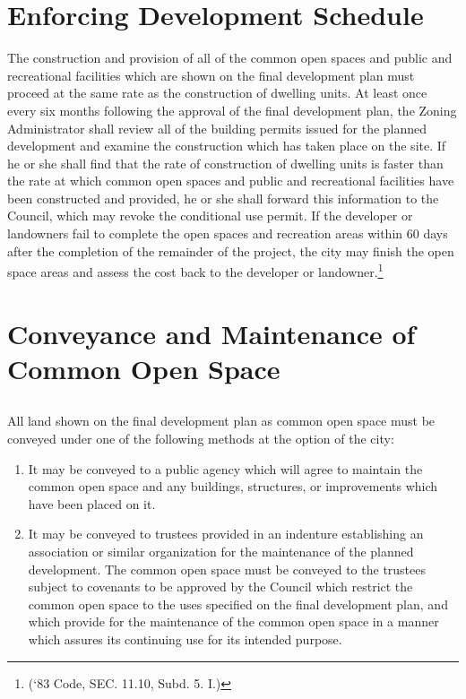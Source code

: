\section{Enforcing Development Schedule}
The construction and provision of all of the common open spaces and public and recreational facilities which are shown on the final development plan must proceed at the same rate as the construction of dwelling units. At least once every six months following the approval of the final development plan, the Zoning Administrator shall review all of the building permits issued for the planned development and examine the construction which has taken place on the site. If he or she shall find that the rate of construction of dwelling units is faster than the rate at which common open spaces and public and recreational facilities have been constructed and provided, he or she shall forward this information to the Council, which may revoke the conditional use permit. If the developer or landowners fail to complete the open spaces and recreation areas within 60 days after the completion of the remainder of the project, the city may finish the open space areas and assess the cost back to the developer or landowner.\footnote{(‘83 Code, SEC. 11.10, Subd. 5. I.)}

\section{Conveyance and Maintenance of Common Open Space}
\subsection{}
All land shown on the final development plan as common open space must be conveyed under one of the following methods at the option of the city:
\begin{enumerate}[{\indent}1)]
    \item It may be conveyed to a public agency which will agree to maintain the common open space and any buildings, structures, or improvements which have been placed on it.
    \item It may be conveyed to trustees provided in an indenture establishing an association or similar organization for the maintenance of the planned development. The common open space must be conveyed to the trustees subject to covenants to be approved by the Council which restrict the common open space to the uses specified on the final development plan, and which provide for the maintenance of the common open space in a manner which assures its continuing use for its intended purpose.
\end{enumerate}
